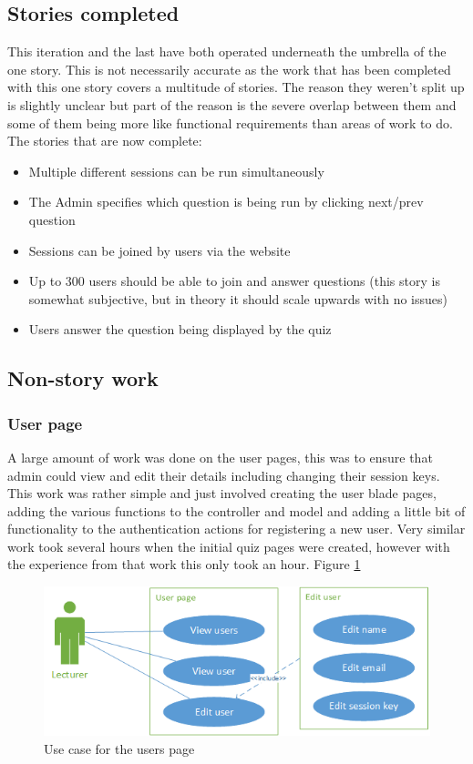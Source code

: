 \subsection{Stories completed}
This iteration and the last have both operated underneath the umbrella of the one story. This is not necessarily accurate as the work that has been completed with this one story covers a multitude of stories. The reason they weren't split up is slightly unclear but part of the reason is the severe overlap between them and some of them being more like functional requirements than areas of work to do. The stories that are now complete:
\begin{itemize}
	\item Multiple different sessions can be run simultaneously
	\item The Admin specifies which question is being run by clicking next/prev question
	\item Sessions can be joined by users via the website
	\item Up to 300 users should be able to join and answer questions (this story is somewhat subjective, but in theory it should scale upwards with no issues)
	\item Users answer the question being displayed by the quiz
\end{itemize}
\newpage

\subsection{Non-story work}
\subsubsection{User page}
A large amount of work was done on the user pages, this was to ensure that admin could view and edit their details including changing their session keys. This work was rather simple and just involved creating the user blade pages, adding the various functions to the controller and model and adding a little bit of functionality to the authentication actions for registering a new user. Very similar work took several hours when the initial quiz pages were created, however with the experience from that work this only took an hour. Figure \ref{fig:iter-5-users-use-case}

\begin{figure}
	\caption{Use case for the users page}
	\centerline{\includegraphics{Chapter2/Iter-5/iter-5-users-use-case}}
	\label{fig:iter-5-users-use-case}
\end{figure}

